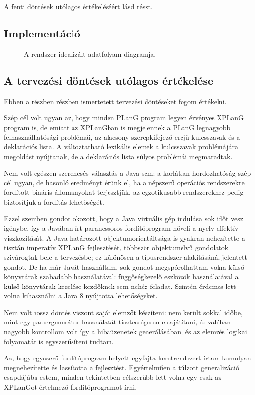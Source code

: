 A fenti döntések utólagos értékeléséért lásd  részt.


\subsection{Implementáció}

\begin{figure}[htb]
	\centering
	\resizebox{\textwidth}{!}{}
	\caption{A rendszer idealizált adatfolyam diagramja.}
\end{figure}


\subsection{A tervezési döntések utólagos értékelése} \label{subsec:planres}
Ebben a részben  részben ismertetett tervezési döntéseket fogom értékelni.

Szép cél volt ugyan az, hogy minden PLanG program legyen érvényes XPLanG program is, de emiatt az XPLanGban is megjelennek a PLanG legnagyobb felhasználhatósági problémái, az alacsony szerepkifejező erejű kulcsszavak és a deklarációs lista.
A változtatható lexikális elemek a kulcsszavak problémájára megoldást nyújtanak, de a deklarációs lista súlyos problémái megmaradtak.

Nem volt egészen szerencsés választás a Java sem: a korlátlan hordozhatóság szép cél ugyan, de hasonló eredményt érünk el, ha a népszerű operációs rendszerekre fordított bináris állományokat terjesztjük, az egzotikusabb rendszerekhez pedig biztosítjuk a fordítás lehetőségét.

Ezzel szemben gondot okozott, hogy a Java virtuális gép indulása sok időt vesz igénybe, így a Javában írt parancssoros fordítóprogram növeli a nyelv effektív viszkozitását.
A Java határozott objektumorientáltsága is gyakran nehezítette a tisztán imperatív XPLanG fejlesztését, többször objektumelvű gondolatok szivárogtak bele a tervezésbe; ez különösen a típusrendszer alakításánál jelentett gondot.
De ha már Javát használtam, sok gondot megspórolhattam volna külső könyvtárak szabadabb használatával: függőségkezelő eszközök használatával a külső könyvtárak kezelése kezdőknek sem nehéz feladat.
Szintén érdemes lett volna kihasználni a Java 8 nyújtotta lehetőségeket.

Nem volt rossz döntés viszont saját elemzőt készíteni: nem került sokkal időbe, mint egy parsergenerátor használatát tisztességesen elsajátítani, és valóban nagyobb kontrollom volt így a hibaüzenetek generálásában, és az elemzés logikai folyamatát is egyszerűsíteni tudtam.

Az, hogy egyszerű fordítóprogram helyett egyfajta keretrendszert írtam komolyan megnehezítette és lassította a fejlesztést.
Egyértelműen a túlzott generalizáció csapdájába estem, minden tekintetben célszerűbb lett volna egy csak az XPLanGot értelmező fordítóprogramot írni.



%
